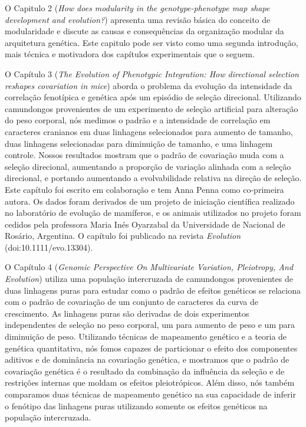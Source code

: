 \begin{refsection}
O Capitulo 2 (\textit{How does modularity in the genotype-phenotype map shape
development and evolution?}) apresenta uma revisão básica do conceito de
modularidade e discute as causas e consequências da organização modular da
arquitetura genética. Este capitulo pode ser visto como uma segunda
introdução, mais técnica e motivadora dos capítulos experimentais que o seguem.

O Capítulo 3 (\textit{The Evolution of Phenotypic Integration: How directional
selection reshapes covariation in mice}) aborda o problema da evolução da
intensidade da correlação fenotípica e genética após um episódio de seleção
direcional. Utilizando camundongos provenientes de um experimento de seleção
artificial para alteração do peso corporal, nós medimos o padrão e a
intensidade de correlação em caracteres cranianos em duas linhagens
selecionados para aumento de tamanho, duas linhagens selecionadas para
diminuição de tamanho, e uma linhagem controle. Nossos resultados mostram que
o padrão de covariação muda com a seleção direcional, aumentando a proporção
de variação alinhada com a seleção direcional, e portando aumentando a
evolvabilidade relativa na direção de seleção. Este capítulo foi escrito em
colaboração e tem Anna Penna como co-primeira autora. Os dados foram derivados
de um projeto de iniciação científica realizado no laboratório de evolução de
mamíferos, e os animais utilizados no projeto foram cedidos pela professora
Maria Inés Oyarzabal da Universidade de Nacional de Rosário, Argentina. O
capítulo foi publicado na revista \textit{Evolution} (doi:10.1111/evo.13304).

O Capítulo 4 (\textit{Genomic Perspective On Multivariate Variation,
Pleiotropy, And Evolution}) utiliza uma população intercruzada de camundongos
provenientes de duas linhagens puras para estudar como o padrão de efeitos
genéticos se relaciona com o padrão de covariação de um conjunto de caracteres
da curva de crescimento. As linhagens puras são derivadas de dois experimentos
independentes de seleção no peso corporal, um para aumento de peso e um para
diminuição de peso. Utilizando técnicas de mapeamento genético e a teoria de
genética quantitativa, nós fomos capazes de particionar o efeito dos
componentes aditivos e de dominância na covariação genética, e mostramos que o
padrão de covariação genética é o resultado da combinação da influência da
seleção e de restrições internas que moldam os efeitos pleiotrópicos. Além
disso, nós também comparamos duas técnicas de mapeamento genético na sua
capacidade de inferir o fenótipo das linhagens puras utilizando somente os
efeitos genéticos na população intercruzada. 


\end{refsection}
